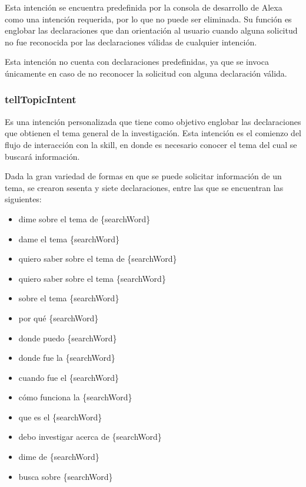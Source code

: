 Esta intención se encuentra predefinida por la consola de desarrollo de Alexa como una intención requerida, por lo que no puede ser eliminada. Su función es englobar las declaraciones que dan orientación al usuario cuando alguna solicitud no fue reconocida por las declaraciones válidas de cualquier intención.

Esta intención no cuenta con declaraciones predefinidas, ya que se invoca únicamente en caso de no reconocer la solicitud con alguna declaración válida.


\subsubsection{tellTopicIntent}
\label{tellTopicIntentcapIV}

Es una intención personalizada que tiene como objetivo englobar las declaraciones que obtienen el tema general de la investigación. Esta intención es el comienzo del flujo de interacción con la skill, en donde es necesario conocer el tema del cual se buscará información.

Dada la gran variedad de formas en que se puede solicitar información de un tema, se crearon sesenta y siete declaraciones, entre las que se encuentran las siguientes:

\begin{itemize}
  \item dime sobre el tema de \{searchWord\}
  \item dame el tema \{searchWord\}
  \item quiero saber sobre el tema de \{searchWord\}
  \item quiero saber sobre el tema \{searchWord\}
  \item sobre el tema \{searchWord\}
  \item por qué \{searchWord\}
  \item donde puedo \{searchWord\}
  \item donde fue la \{searchWord\}
  \item cuando fue el \{searchWord\}
  \item cómo funciona la \{searchWord\}
  \item que es el \{searchWord\}
  \item debo investigar acerca de \{searchWord\}
  \item dime de \{searchWord\}
  \item busca sobre \{searchWord\}
\end{itemize}

